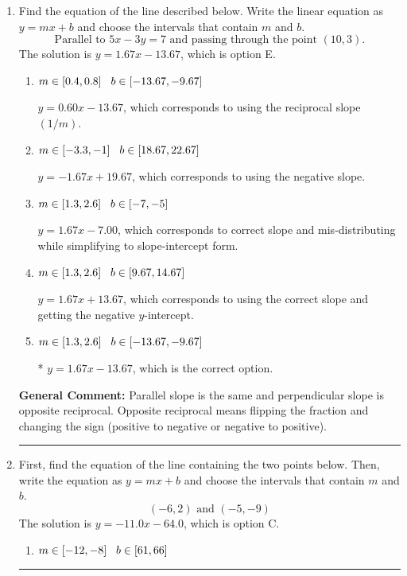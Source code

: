 \documentclass{extbook}[14pt]
\newcommand{\litem}[1]{\item #1

\rule{\textwidth}{0.4pt}}
\begin{document}
\begin{enumerate}\litem{
Find the equation of the line described below. Write the linear equation as $ y=mx+b $ and choose the intervals that contain $m$ and $b$.
\[ \text{Parallel to } 5 x - 3 y = 7 \text{ and passing through the point } (10, 3). \]The solution is \( y = 1.67x - 13.67 \), which is option E.\begin{enumerate}[label=\Alph*.]
\item \( m \in [0.4, 0.8] \hspace*{3mm} b \in [-13.67, -9.67] \)

 $y = 0.60x - 13.67$, which corresponds to using the reciprocal slope $(1/m)$.
\item \( m \in [-3.3, -1] \hspace*{3mm} b \in [18.67, 22.67] \)

 $y = -1.67x + 19.67$, which corresponds to using the negative slope.
\item \( m \in [1.3, 2.6] \hspace*{3mm} b \in [-7, -5] \)

 $y = 1.67x - 7.00$, which corresponds to correct slope and mis-distributing while simplifying to slope-intercept form.
\item \( m \in [1.3, 2.6] \hspace*{3mm} b \in [9.67, 14.67] \)

 $y = 1.67x + 13.67$, which corresponds to using the correct slope and getting the negative $y$-intercept.
\item \( m \in [1.3, 2.6] \hspace*{3mm} b \in [-13.67, -9.67] \)

* $y = 1.67x - 13.67$, which is the correct option.
\end{enumerate}

\textbf{General Comment:} Parallel slope is the same and perpendicular slope is opposite reciprocal. Opposite reciprocal means flipping the fraction and changing the sign (positive to negative or negative to positive).
}
\litem{
First, find the equation of the line containing the two points below. Then, write the equation as $ y=mx+b $ and choose the intervals that contain $m$ and $b$.
\[ (-6, 2) \text{ and } (-5, -9) \]The solution is \( y = -11.0x -64.0 \), which is option C.\begin{enumerate}[label=\Alph*.]
\item \( m \in [-12, -8] \hspace*{3mm} b \in [61, 66] \)


\end{enumerate}}
\end{enumerate}
\end{document}
